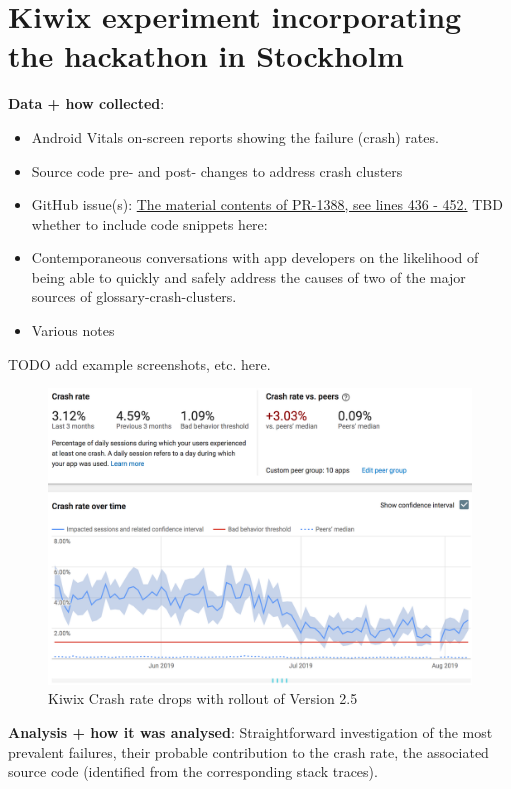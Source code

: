 \section[Kiwix experiment]{Kiwix experiment incorporating the hackathon in Stockholm}

\textbf{Data + how collected}: 
\begin{itemize}
    \item Android Vitals on-screen reports showing the failure (crash) rates.
    \item Source code pre- and post- changes to address crash clusters
    \item GitHub issue(s): \href{https://github.com/kiwix/kiwix-android/pull/1388}{The material contents of PR-1388, see lines 436 - 452.} TBD whether to include code snippets here:
    \item Contemporaneous conversations with app developers on the likelihood of being able to quickly and safely address the causes of two of the major sources of \glspl{glossary-crash-cluster}.
    \item Various notes
\end{itemize}
TODO add example screenshots, etc. here.



\begin{figure}
    \centering
    \includegraphics[width=\textwidth]{images/android-vitals-screenshots/kiwix/kiwix-crash-rate-drops-with-v2_5.png}
    \caption{Kiwix Crash rate drops with rollout of Version 2.5}
    \label{fig:kiwix-crash-rate-drops-with-v2_5}
\end{figure}

\textbf{Analysis + how it was analysed}: 
Straightforward investigation of the most prevalent failures, their probable contribution to the crash rate, the associated source code (identified from the corresponding stack traces).


